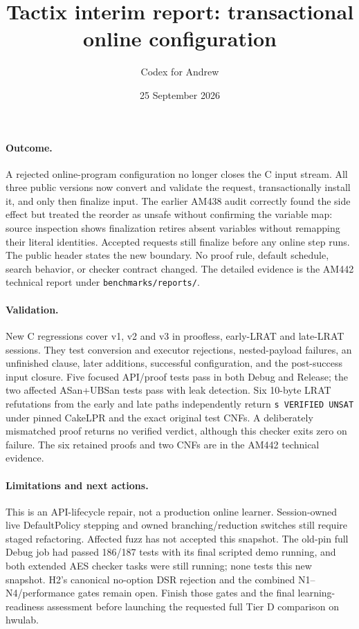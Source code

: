 \documentclass[11pt]{article}
\title{Tactix interim report: transactional online configuration}
\author{Codex for Andrew}
\date{25 September 2026}
\begin{document}
\maketitle

\paragraph{Outcome.} A rejected online-program configuration no longer closes
the C input stream. All three public versions now convert and validate the
request, transactionally install it, and only then finalize input. The earlier
AM438 audit correctly found the side effect but treated the reorder as unsafe
without confirming the variable map: source inspection shows finalization
retires absent variables without remapping their literal identities. Accepted
requests still finalize before any online step runs. The public header states
the new boundary. No proof rule, default schedule, search behavior, or checker
contract changed. The detailed evidence is the AM442 technical report under
\texttt{benchmarks/reports/}.

\paragraph{Validation.} New C regressions cover v1, v2 and v3 in proofless,
early-LRAT and late-LRAT sessions. They test conversion and executor
rejections, nested-payload failures, an unfinished clause, later additions,
successful configuration, and the post-success input closure. Five focused
API/proof tests pass in both Debug and Release; the two affected ASan+UBSan
tests pass with leak detection. Six 10-byte LRAT refutations from the early
and late paths independently return \texttt{s VERIFIED UNSAT} under pinned
CakeLPR and the exact original test CNFs. A deliberately mismatched proof
returns no verified verdict, although this checker exits zero on failure.
The six retained proofs and two CNFs are in the AM442 technical evidence.

\paragraph{Limitations and next actions.} This is an API-lifecycle repair,
not a production online learner. Session-owned live DefaultPolicy stepping and
owned branching/reduction switches still require staged refactoring. Affected
fuzz has not accepted this snapshot. The old-pin full Debug job had passed
186/187 tests with its final scripted demo running, and both extended AES
checker tasks were still running; none tests this new snapshot. H2's canonical
no-option DSR rejection and the combined N1--N4/performance gates remain
open. Finish those gates and the final learning-readiness assessment before
launching the requested full Tier D comparison on hwulab.
\end{document}
